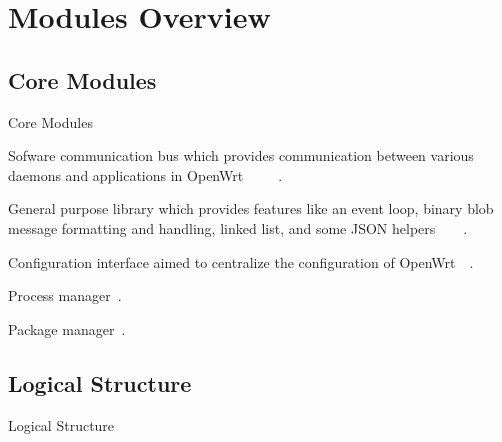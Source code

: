 \section{Modules Overview}

\subsection{Core Modules}
\begin{frame}{Core Modules}
    \pause
    \begin{description}[<+-|alert@+>]
        \item[ubus] Sofware communication bus which provides communication between various daemons and applications in OpenWrt~\cite{openwrt-ubus}~\cite{lutfi-ubus}~\cite{lutfi-ubox_ubus}~\cite{openwrt-rpc_guide}~\cite{openwrt-rpc_techref}.
        \item[ubox] General purpose library which provides features like an event loop, binary blob message formatting and handling, linked list, and some JSON helpers~\cite{openwrt-ubox}~\cite{openwrt-libubox}~\cite{lutfi-ubox_ubus}~\cite{openwrt-log}.
        \item[uci] Configuration interface aimed to centralize the configuration of OpenWrt~\cite{openwrt-uci}~\cite{openwrt-libuci}.
        \item[procd] Process manager~\cite{openwrt-procd}.
        \item[opkg] Package manager~\cite{openwrt-opkg}.
    \end{description}
\end{frame}

\subsection{Logical Structure}
\begin{frame}{Logical Structure}
\end{frame}
